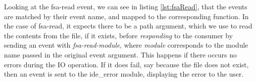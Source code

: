 Looking at the fsa-read event, we can see in listing \ref{lst:fsaRead}, that the
events are matched by their event name, and mapped to the corresponding function.
In the case of fsa-read, it expects there to be a path argument, which we use to
read the contents from the file, if it exists, before \textit{responding} to the
consumer by sending an event with \textit{fsa-read-module}, where
\textit{module} corresponds to the module name passed in the original event
argument. This happens if there occurs no errors\footnotemark{} during the IO
operation. If it does fail, say because the file does not exist, then an event
is sent to the ide\_error module, displaying the error to the user.

